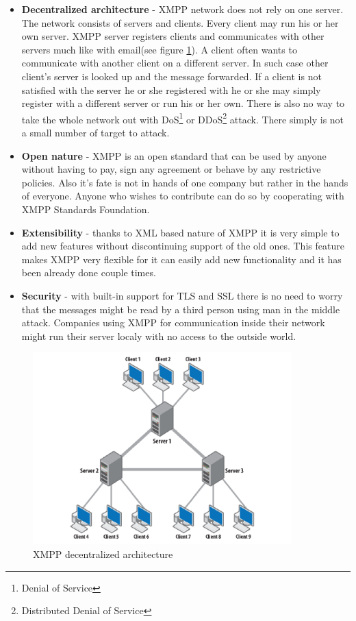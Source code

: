 \begin{itemize}
	\item \textbf{Decentralized architecture} - XMPP network does not rely on one server. The network consists of servers and clients. Every client may run his or her own server. XMPP server registers clients and communicates with other servers much like with email(see figure \ref{fig:xmpp-decentralized-architecture}). A client often wants to communicate with another client on a different server. In such case other client's server is looked up and the message forwarded. If a client is not satisfied with the server he or she registered with he or she may simply register with a different server or run his or her own. There is also no way to take the whole network out with DoS\footnote{Denial of Service} or DDoS\footnote{Distributed Denial of Service} attack. There simply is not a small number of target to attack.    
	\item  \textbf{Open nature} - XMPP is an open standard that can be used by anyone without having to pay, sign any agreement or behave by any restrictive policies. Also it's fate is not in hands of one company but rather in the hands of everyone. Anyone who wishes to contribute can do so by cooperating with XMPP Standards Foundation. 
	\item \textbf{Extensibility} - thanks to XML based nature of XMPP it is very simple to add new features without discontinuing support of the old ones. This feature makes XMPP very flexible for it can easily add new functionality and it has been already done couple times.  
	\item \textbf{Security} - with built-in support for TLS and SSL there is no need to worry that the messages might be read by a third person using man in the middle attack. Companies using XMPP for communication inside their network might run their server localy with no access to the outside world.  
\end{itemize}

\begin{figure}[ht]
\begin{center}
	\includegraphics[width=10cm]{fig/XMPP-decentralized-architecture.png}
	\caption{XMPP decentralized architecture \cite{xmppBook}}
	\label{fig:xmpp-decentralized-architecture}
\end{center}
\end{figure}

